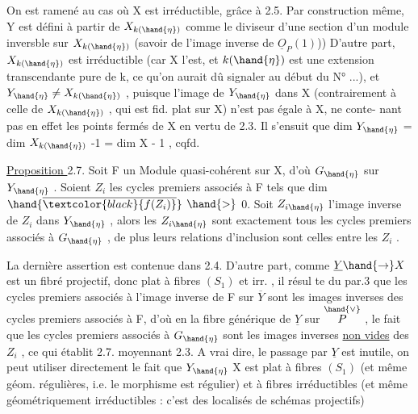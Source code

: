 
On est ramené au cas où X est irréductible, grâce à 2.5. Par construction
même, Y est défini à partir de $X_{k(\hand{\eta})}$ comme le diviseur d'une section
d'un module inversble sur $X_{k(\hand{\eta})}$ (savoir de l'image inverse de $\underline{O}_P(1)$))
D'autre part, $X_{k(\hand{\eta})}$ est irréductible (car X l'est, et $k(\hand{\eta})$ est une
\margin{|} extension transcendante pure de k, ce qu'on aurait dû signaler au début du
N° ...), et $Y_{\hand{\eta}} \neq X_{k(\hand{\eta})}$ , puisque l'image de $Y_{\hand{\eta}}$ dans X (contrairement
à celle de $X_{k(\hand{\eta})}$ , qui est fid. plat sur X) n'est pas égale à X, ne conte-%
nant pas en effet les points fermés de X en vertu de 2.3. Il s'ensuit que
dim $Y_{\hand{\eta}}$ = dim $X_{k(\hand{\eta})}$ -1  = dim X - 1 , cqfd.

\uline{Proposition }2.7. Soit F un Module quasi-cohérent sur X, d'où $G_{\hand{\eta}}$ sur $Y_{\hand{\eta}}$ .
Soient $Z_i$ les cycles premiers associés à F tels que dim $\hand{\overline{\textcolor{black}{f(Z_i)}}}$ $\hand{>}$ 0. Soit
$Z_{i\hand{\eta}}$ l'image inverse de $Z_i$ dans $Y_{\hand{\eta}}$ , alors les $Z_{i\hand{\eta}}$ sont exactement tous
les cycles premiers associés à $G_{\hand{\eta}}$ , de plus leurs relations d'inclusion
sont celles entre les $Z_i$ .

La dernière assertion est contenue dans 2.4. D'autre part, comme
$\underline{Y} \hand{\rightarrow} X$ est un fibré projectif, donc plat à fibres $(S_1)$ et irr. , il résul
te du par.3 que les cycles premiers associés à l'image inverse  de F sur
$\overline{Y}$ sont les images inverses  des cycles premiers associés à F,
d'où en   la fibre générique  de $\underline{Y}$ sur $\overset{\hand{\vee}}{P}$ , le fait que les
cycles premiers associés à $G_{\hand{\eta}}$ sont les images inverses \uline{non vides} des $Z_i$ ,
ce qui établit 2.7. moyennant 2.3. A vrai dire, le passage par $\underline{Y}$ est
inutile, on peut utiliser directement le fait que $Y_{\hand{\eta}}$ \hand{$\longrightarrow$} X est plat à
fibres $(S_1)$ (et même géom. régulières, i.e. le morphisme est régulier)
et à fibres irréductibles (et même géométriquement irréductibles : c'est
des localisés de schémas projectifs)\hand{;} 

